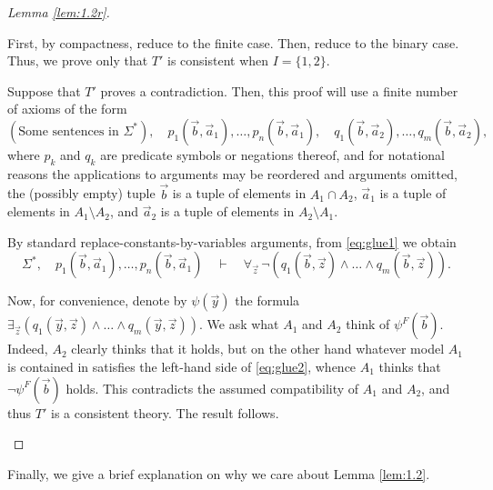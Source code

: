 \documentclass{article}
\theoremstyle{nonumberplain}
\newtheorem{proof}{Proof}
\begin{document}
\begin{proof}[Lemma \ref{lem:1.2r}]
\begin{enumerate}
First, by compactness, reduce to the finite case. Then, reduce to the binary case. Thus, we prove only that $T'$ is consistent when $I = \{1,2\}$.

Suppose that $T'$ proves a contradiction. Then, this proof will use a finite number of axioms of the form
\begin{equation}\label{eq:glue1}
(\text{Some sentences in $\Sigma^*$}),\quad p_1(\vec b, \vec a_1), \dots, p_n(\vec b, \vec a_1),\quad q_1(\vec b, \vec a_2), \dots, q_m(\vec b, \vec a_2),
\end{equation}
where $p_k$ and $q_k$ are predicate symbols or negations thereof, and for notational reasons the applications to arguments may be reordered and arguments omitted, the (possibly empty) tuple $\vec b$ is a tuple of elements in $A_1 \cap A_2$, $\vec a_1$ is a tuple of elements in $A_1 \setminus A_2$, and $\vec a_2$ is a tuple of elements in $A_2 \setminus A_1$.

By standard replace-constants-by-variables arguments, from \eqref{eq:glue1} we obtain
\begin{equation}\label{eq:glue2}
\Sigma^*, \quad p_1(\vec b, \vec a_1), \dots, p_n(\vec b, \vec a_1) \quad \vdash \quad \forall_{\vec z} \,\neg(q_1(\vec b, \vec z) \land \dots \land q_m(\vec b, \vec z)).
\end{equation}

Now, for convenience, denote by $\psi(\vec y)$ the formula $\exists_{\vec z} (q_1(\vec y, \vec z) \land \dots \land q_m(\vec y, \vec z))$. We ask what $A_1$ and $A_2$ think of $\psi^F(\vec b)$. Indeed, $A_2$ clearly thinks that it holds, but on the other hand whatever model $A_1$ is contained in satisfies the left-hand side of \eqref{eq:glue2}, whence $A_1$ thinks that $\neg \psi^F(\vec b)$ holds. This contradicts the assumed compatibility of $A_1$ and $A_2$, and thus $T'$ is a consistent theory. The result follows.
\end{enumerate}
\end{proof}

Finally, we give a brief explanation on why we care about Lemma \ref{lem:1.2}.
\end{document}
